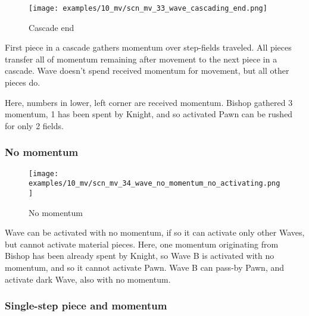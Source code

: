 \clearpage %

\vspace*{-2.1\baselineskip}
\noindent
\begin{figure}[h]
\texttt{[image: examples/10\_mv/scn\_mv\_33\_wave\_cascading\_end.png]}
\vspace*{-1.3\baselineskip}
\caption{Cascade end}
\label{fig:scn_mv_33_wave_cascading_end}
\end{figure}

\vspace*{-0.3\baselineskip}
First piece in a cascade gathers momentum over step-fields traveled. All pieces
transfer all of momentum remaining after movement to the next piece in a cascade.
Wave doesn't spend received momentum for movement, but all other pieces do.

Here, numbers in lower, left corner are received momentum. Bishop gathered 3 momentum,
1 has been spent by Knight, and so activated Pawn can be rushed for only 2 fields.

\clearpage %

\subsubsection*{No momentum}
\label{sec:Miranda's veil/Wave/Cascading Waves/No momentum}

\vspace*{-1.4\baselineskip}
\noindent
\begin{figure}[h]
\texttt{[image: examples/10\_mv/scn\_mv\_34\_wave\_no\_momentum\_no\_activating.png]}
\caption{No momentum}
\label{fig:scn_mv_34_wave_no_momentum_no_activating}
\end{figure}

Wave can be activated with no momentum, if so it can activate only other Waves, but
cannot activate material pieces. Here, one momentum originating from Bishop has been
already spent by Knight, so Wave B is activated with no momentum, and so it cannot
activate Pawn. Wave B can pass-by Pawn, and activate dark Wave, also with no momentum.

\clearpage %

\subsubsection*{Single-step piece and momentum}
\label{sec:Miranda's veil/Wave/Cascading Waves/Single-step piece and momentum}


